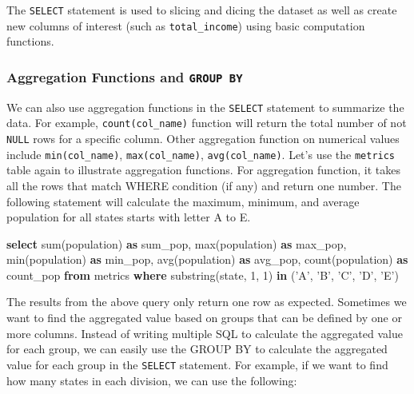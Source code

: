 \documentclass[12pt,]{krantz}
\makeatletter
\newenvironment{Shaded}{\begin{snugshade}}{\end{snugshade}}
\newcommand{\DecValTok}[1]{\textcolor[rgb]{0.06,0.06,0.06}{#1}}
\newcommand{\FunctionTok}[1]{\textcolor[rgb]{0,0,0}{#1}}
\newcommand{\KeywordTok}[1]{\textcolor[rgb]{0.27,0.27,0.27}{\textbf{#1}}}
\newcommand{\NormalTok}[1]{#1}
\newcommand{\StringTok}[1]{\textcolor[rgb]{0.5,0.5,0.5}{#1}}
\newenvironment{kframe}{%
\medskip{}
\setlength{\fboxsep}{.8em}
 \def\at@end@of@kframe{}%
 \ifinner\ifhmode%
  \def\at@end@of@kframe{\end{minipage}}%
  \begin{minipage}{\columnwidth}%
 \fi\fi%
 \def\FrameCommand##1{\hskip\@totalleftmargin \hskip-\fboxsep
 \colorbox{shadecolor}{##1}\hskip-\fboxsep
     \hskip-\linewidth \hskip-\@totalleftmargin \hskip\columnwidth}%
 \MakeFramed {\advance\hsize-\width
   \@totalleftmargin\z@ \linewidth\hsize
   \@setminipage}}%
 {\par\unskip\endMakeFramed%
 \at@end@of@kframe}
\renewenvironment{Shaded}{\begin{kframe}}{\end{kframe}}
\makeatother
\begin{document}
The \texttt{SELECT} statement is used to slicing and dicing the dataset as well as create new columns of interest (such as \texttt{total\_income}) using basic computation functions.

\hypertarget{aggregation-functions-and-group-by}{%
\subsubsection{\texorpdfstring{Aggregation Functions and \texttt{GROUP\ BY}}{Aggregation Functions and GROUP BY}}\label{aggregation-functions-and-group-by}}

We can also use aggregation functions in the \texttt{SELECT} statement to summarize the data. For example, \texttt{count(col\_name)} function will return the total number of not \texttt{NULL} rows for a specific column. Other aggregation function on numerical values include \texttt{min(col\_name)}, \texttt{max(col\_name)}, \texttt{avg(col\_name)}. Let's use the \texttt{metrics} table again to illustrate aggregation functions. For aggregation function, it takes all the rows that match WHERE condition (if any) and return one number. The following statement will calculate the maximum, minimum, and average population for all states starts with letter A to E.

\begin{Shaded}
\begin{Highlighting}[]
\KeywordTok{select} \FunctionTok{sum}\NormalTok{(population) }\KeywordTok{as}\NormalTok{ sum_pop, }\FunctionTok{max}\NormalTok{(population) }\KeywordTok{as}
\NormalTok{max_pop, }\FunctionTok{min}\NormalTok{(population) }\KeywordTok{as}\NormalTok{ min_pop, }\FunctionTok{avg}\NormalTok{(population)}
\KeywordTok{as}\NormalTok{ avg_pop, }\FunctionTok{count}\NormalTok{(population) }\KeywordTok{as}\NormalTok{ count_pop}
\KeywordTok{from}\NormalTok{ metrics}
\KeywordTok{where}\NormalTok{ substring(state, }\DecValTok{1}\NormalTok{, }\DecValTok{1}\NormalTok{) }\KeywordTok{in}\NormalTok{ (}\StringTok{'A'}\NormalTok{, }\StringTok{'B'}\NormalTok{, }\StringTok{'C'}\NormalTok{, }\StringTok{'D'}\NormalTok{, }\StringTok{'E'}\NormalTok{)}
\end{Highlighting}
\end{Shaded}

The results from the above query only return one row as expected. Sometimes we want to find the aggregated value based on groups that can be defined by one or more columns. Instead of writing multiple SQL to calculate the aggregated value for each group, we can easily use the GROUP BY to calculate the aggregated value for each group in the \texttt{SELECT} statement. For example, if we want to find how many states in each division, we can use the following:
\end{document}
